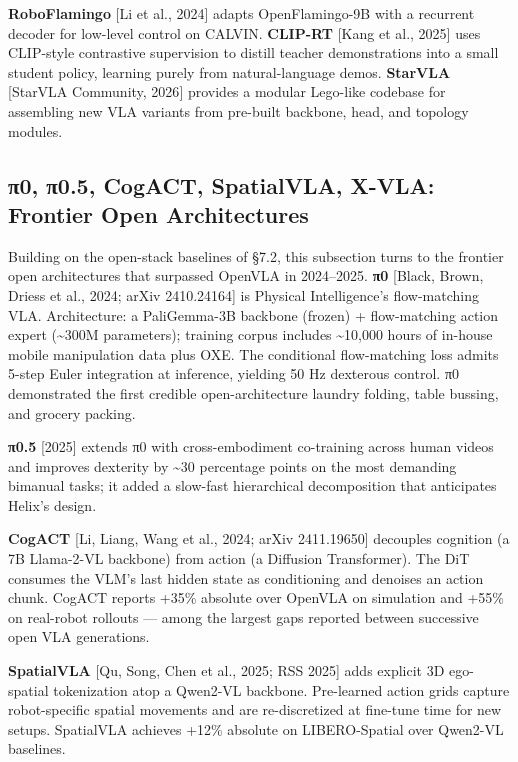 \textbf{RoboFlamingo} {[}Li et al., 2024{]} adapts OpenFlamingo-9B with a recurrent decoder for low-level control on CALVIN. \textbf{CLIP-RT} {[}Kang et al., 2025{]} uses CLIP-style contrastive supervision to distill teacher demonstrations into a small student policy, learning purely from natural-language demos. \textbf{StarVLA} {[}StarVLA Community, 2026{]} provides a modular Lego-like codebase for assembling new VLA variants from pre-built backbone, head, and topology modules.

\subsection{π0, π0.5, CogACT, SpatialVLA, X-VLA: Frontier Open Architectures}\label{ux3c00-ux3c00.5-cogact-spatialvla-x-vla-frontier-open-architectures}

Building on the open-stack baselines of §7.2, this subsection turns to the frontier open architectures that surpassed OpenVLA in 2024--2025. \textbf{π0} {[}Black, Brown, Driess et al., 2024; arXiv 2410.24164{]} is Physical Intelligence's flow-matching VLA. Architecture: a PaliGemma-3B backbone (frozen) + flow-matching action expert (\textasciitilde300M parameters); training corpus includes \textasciitilde10,000 hours of in-house mobile manipulation data plus OXE. The conditional flow-matching loss admits 5-step Euler integration at inference, yielding 50 Hz dexterous control. π0 demonstrated the first credible open-architecture laundry folding, table bussing, and grocery packing.

\textbf{π0.5} {[}2025{]} extends π0 with cross-embodiment co-training across human videos and improves dexterity by \textasciitilde30 percentage points on the most demanding bimanual tasks; it added a slow-fast hierarchical decomposition that anticipates Helix's design.

\textbf{CogACT} {[}Li, Liang, Wang et al., 2024; arXiv 2411.19650{]} decouples cognition (a 7B Llama-2-VL backbone) from action (a Diffusion Transformer). The DiT consumes the VLM's last hidden state as conditioning and denoises an action chunk. CogACT reports +35\% absolute over OpenVLA on simulation and +55\% on real-robot rollouts --- among the largest gaps reported between successive open VLA generations.

\textbf{SpatialVLA} {[}Qu, Song, Chen et al., 2025; RSS 2025{]} adds explicit 3D ego-spatial tokenization atop a Qwen2-VL backbone. Pre-learned action grids capture robot-specific spatial movements and are re-discretized at fine-tune time for new setups. SpatialVLA achieves +12\% absolute on LIBERO-Spatial over Qwen2-VL baselines.

